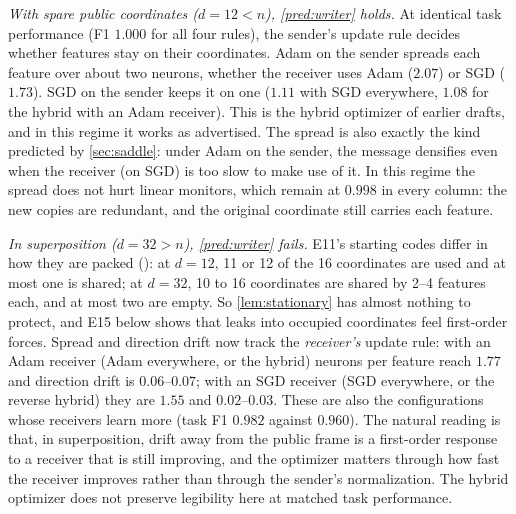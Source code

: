 \emph{With spare public coordinates ($d=12<n$), \cref{pred:writer} holds.} At identical task performance (F1 $1.000$
for all four rules), the sender's update rule decides whether features stay on their coordinates. Adam on the sender
spreads each feature over about two neurons, whether the receiver uses Adam ($2.07$) or SGD ($1.73$). SGD on the
sender keeps it on one ($1.11$ with SGD everywhere, $1.08$ for the hybrid with an Adam receiver). This is the
hybrid optimizer of earlier drafts, and in this regime it works as advertised. The spread is also exactly the kind
predicted by \cref{sec:saddle}: under Adam on the sender, the message densifies even when the receiver (on SGD) is
too slow to make use of it. In this regime the spread does not hurt linear monitors, which remain at $0.998$ in
every column: the new copies are redundant, and the original coordinate still carries each feature.

\emph{In superposition ($d=32>n$), \cref{pred:writer} fails.} E11's starting codes differ in how they are packed
(): at $d=12$, 11 or 12 of the 16 coordinates are used and at most one is shared; at $d=32$,
10 to 16 coordinates are shared by 2--4 features each, and at most two are empty. So \cref{lem:stationary} has
almost nothing to protect, and E15 below shows that leaks into occupied coordinates feel first-order forces. Spread and direction
drift now track the \emph{receiver's} update rule: with an Adam receiver (Adam everywhere, or the hybrid) neurons per
feature reach $1.77$ and direction drift is $0.06$--$0.07$; with an SGD receiver (SGD everywhere, or the reverse
hybrid) they are $1.55$ and $0.02$--$0.03$. These are also the configurations whose receivers learn more (task F1
$0.982$ against $0.960$). The natural reading is that, in superposition, drift away from the public frame is
a first-order response to a receiver that is still improving, and the optimizer matters through how fast the
receiver improves rather than through the sender's normalization. The hybrid optimizer does not preserve legibility
here at matched task performance.

